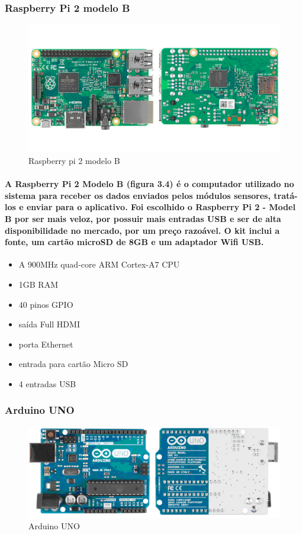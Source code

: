 \subsubsection{Raspberry Pi 2 modelo B}
\begin{figure}[H]
\includegraphics[width=1\textwidth]{figuras/raspberry_pi.png}
\caption{\label{fig:raspberry pi} Raspberry pi 2 modelo B}
\end{figure}
\paragraph{
A Raspberry Pi 2 Modelo B (figura 3.4) é o computador utilizado no sistema para receber os dados enviados pelos módulos sensores, tratá-los e enviar para o aplicativo. Foi escolhido o Raspberry Pi 2 - Model B por ser mais veloz, por possuir mais entradas USB e ser de alta disponibilidade no mercado, por um preço razoável. O kit inclui a fonte, um cartão microSD de 8GB e um adaptador Wifi USB.
}
\begin{itemize}
\item{A 900MHz quad-core ARM Cortex-A7 CPU}
\item{1GB RAM}
\item{40 pinos GPIO}
\item{saída Full HDMI}
\item{porta Ethernet}
\item{entrada para cartão Micro SD}
\item{4 entradas USB}
\end{itemize}

\subsubsection{Arduino UNO}
\begin{figure}[H]
\includegraphics[width=1\textwidth]{figuras/arduino_uno.png}
\caption{\label{fig:arduino uno} Arduino UNO}
\end{figure}
